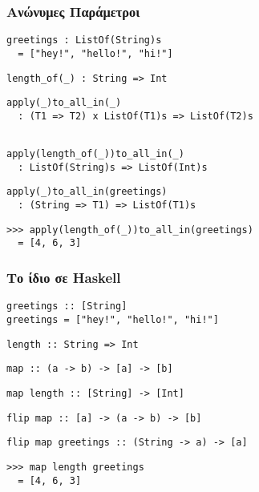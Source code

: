 \documentclass{beamer}
\def\e{\foreignlanguage{english}}
\def\h{\e{Haskell}}
\begin{document}
\begin{frame}[fragile]

\frametitle{Ανώνυμες Παράμετροι}

\begin{otherlanguage}{english}

\begin{verbatim}
greetings : ListOf(String)s
  = ["hey!", "hello!", "hi!"]
\end{verbatim}
\begin{verbatim}
length_of(_) : String => Int
\end{verbatim}
\begin{verbatim}
apply(_)to_all_in(_)
  : (T1 => T2) x ListOf(T1)s => ListOf(T2)s


\end{verbatim}
\pause
\begin{verbatim}
apply(length_of(_))to_all_in(_)
  : ListOf(String)s => ListOf(Int)s
\end{verbatim}
\begin{verbatim}
apply(_)to_all_in(greetings)
  : (String => T1) => ListOf(T1)s
\end{verbatim}
\pause
\begin{verbatim}
>>> apply(length_of(_))to_all_in(greetings)
  = [4, 6, 3]
\end{verbatim}

\end{otherlanguage}

\end{frame}

\begin{frame}[fragile]

\frametitle{Το ίδιο σε \h}

\begin{otherlanguage}{english}

\begin{verbatim}
greetings :: [String]
greetings = ["hey!", "hello!", "hi!"]
\end{verbatim}
\begin{verbatim}
length :: String => Int
\end{verbatim}
\begin{verbatim}
map :: (a -> b) -> [a] -> [b]

\end{verbatim}
\pause
\begin{verbatim}
map length :: [String] -> [Int]
\end{verbatim}
\begin{verbatim}
flip map :: [a] -> (a -> b) -> [b]
\end{verbatim}
\begin{verbatim}
flip map greetings :: (String -> a) -> [a]
\end{verbatim}
\pause
\begin{verbatim}
>>> map length greetings
  = [4, 6, 3]
\end{verbatim}

\end{otherlanguage}

\end{frame}
\end{document}
